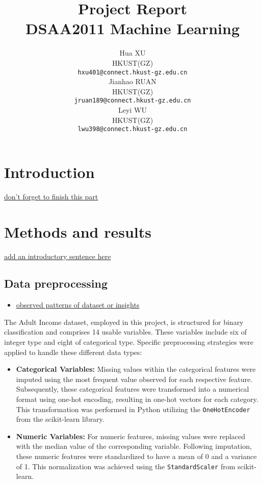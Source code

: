 \documentclass{article}
\title{Project Report \large \\ DSAA2011 Machine Learning}
\author{%
   Hua XU \\
   HKUST(GZ) \\
   \texttt{hxu401@connect.hkust-gz.edu.cn} \\
   \And
   Jianhao RUAN \\
   HKUST(GZ) \\
   \texttt{jruan189@connect.hkust-gz.edu.cn} \\
   \And
   Leyi WU \\
   HKUST(GZ) \\
   \texttt{lwu398@connect.hkust-gz.edu.cn} \\
}
\begin{document}
\maketitle

\section{Introduction}

\underline{don't forget to finish this part}


\section{Methods and results}

\underline{add an introductory sentence here}

\subsection{Data preprocessing}

\begin{itemize}
    \item \underline{observed patterns of dataset or insights}
\end{itemize}

The Adult Income dataset, employed in this project, is structured for binary classification and comprises 14 usable variables. These variables include six of integer type and eight of categorical type. Specific preprocessing strategies were applied to handle these different data types:

\begin{itemize}
    \item \textbf{Categorical Variables:} Missing values within the categorical features were imputed using the most frequent value observed for each respective feature. Subsequently, these categorical features were transformed into a numerical format using one-hot encoding, resulting in one-hot vectors for each category. This transformation was performed in Python utilizing the \texttt{OneHotEncoder} from the scikit-learn library.
    \item \textbf{Numeric Variables:} For numeric features, missing values were replaced with the median value of the corresponding variable. Following imputation, these numeric features were standardized to have a mean of 0 and a variance of 1. This normalization was achieved using the \texttt{StandardScaler} from scikit-learn.
\end{itemize}
\end{document}

